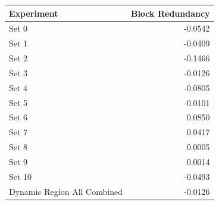 \begin{tabular}{lr}
\toprule
Experiment & Block Redundancy \\
\midrule
Set 0 & -0.0542 \\
Set 1 & -0.0409 \\
Set 2 & -0.1466 \\
Set 3 & -0.0126 \\
Set 4 & -0.0805 \\
Set 5 & -0.0101 \\
Set 6 & 0.0850 \\
Set 7 & 0.0417 \\
Set 8 & 0.0005 \\
Set 9 & 0.0014 \\
Set 10 & -0.0493 \\
Dynamic Region All Combined & -0.0126 \\
\bottomrule
\end{tabular}
